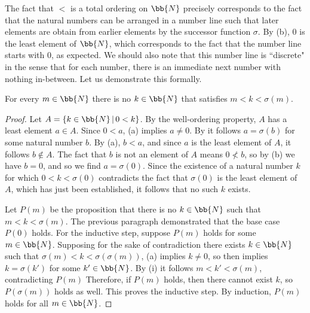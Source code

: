 The fact that $<$ is a total ordering on $\bb{N}$ precisely corresponds to the fact that the natural numbers can be arranged in a number line such that later elements are obtain from earlier elements by the successor function $\sigma$. 
By  (b), $0$ is the least element of $\bb{N}$, which corresponds to the fact that the number line starts with $0$, as expected. 
We should also note that this number line is ``discrete" in the sense that for each number, there is an immediate next number with nothing in-between.
Let us demonstrate this formally.

\begin{corollary}\label{ch1thm_no_between_nat}
	For every $m\in\bb{N}$ there is no $k\in\bb{N}$ that satisfies $m < k < \sigma(m)$.
\end{corollary}
\begin{proof}
	Let $A = \{ k\in\bb{N} \,|\, 0 < k \}$.
	By the well-ordering property, $A$ has a least element $a\in A$. 
	Since $0 < a$,  (a) implies $a\ne 0$. 
	By  it follows $a = \sigma(b)$ for some natural number $b$. 
	By  (a), $b < a$, and since $a$ is the least element of $A$, it follows $b\notin A$. 
	The fact that $b$ is not an element of $A$ means $0\not< b$, so by  (b) we have $b = 0$, and so we find $a = \sigma(0)$.
	Since the existence of a natural number $k$ for which $0 < k < \sigma(0)$ contradicts the fact that $\sigma(0)$ is the least element of $A$, which has just been established, it follows that no such $k$ exists. 
	
	Let $P(m)$ be the proposition that there is no $k\in\bb{N}$ such that $m < k < \sigma(m)$. 
	The previous paragraph demonstrated that the base case $P(0)$ holds.
	For the inductive step, suppose $P(m)$ holds for some $m\in\bb{N}$. 
	Supposing for the sake of contradiction there exists $k\in\bb{N}$ such that $\sigma(m) < k < \sigma(\sigma(m))$,  (a) implies $k\ne 0$, so then  implies $k = \sigma(k')$ for some $k'\in\bb{N}$. 
	By  (i) it follows $m < k' < \sigma(m)$, contradicting $P(m)$
	Therefore, if $P(m)$ holds, then there cannot exist $k$, so $P(\sigma(m))$ holds as well. 
	This proves the inductive step.
	By induction, $P(m)$ holds for all $m\in\bb{N}$. 
\end{proof}



